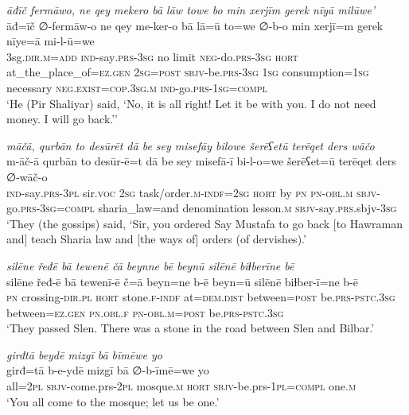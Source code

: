 \ea \label{ŽP.105}
\textit{āđīč fermāwo, ne qey mekero bā lāw towe bo min xerjīm gerek nīyā milūwe’} \\ 
\gll āđ=īč ∅-fermāw-o ne qey me-ker-o bā lā=ū to=we ∅-b-o min xerjī=m gerek nīye=ā mi-l-ū=we \\ 
 3sg\textsc{.dir}\textsc{.m}\textsc{=add} \textsc{ind-}say\textsc{.prs}\textsc{-3sg} no limit \textsc{neg-}do\textsc{.prs}\textsc{-3sg} \textsc{hort} at\_the\_place\_of\textsc{\textsc{=ez.gen}} \textsc{2sg}\textsc{=\textsc{post}} \textsc{sbjv-}be\textsc{.prs}\textsc{-3sg} \textsc{1sg} consumption\textsc{=\textsc{1sg}} necessary \textsc{\textsc{neg.}exist}\textsc{=cop}\textsc{.3sg}\textsc{.m} \textsc{ind-}go\textsc{.prs}\textsc{-\textsc{1sg}}\textsc{=compl} \\ 
\glt `He (Pir Shaliyar) said, ‘No, it is all right! Let it be with you. I do not need money. I will go back.’'
\z 
 
\ea \label{ŽP.126}
\textit{māčā, qurbān to desūrēt dā be sey misefāy bilowe šerēʕetū terēqet ders wāčo} \\ 
\gll m-āč-ā qurbān to desūr-ē=t dā be sey misefā-ī bi-l-o=we šerēʕet=ū terēqet ders ∅-wāč-o \\ 
 \textsc{ind-}say\textsc{.prs}\textsc{-3pl} sir.\textsc{voc} \textsc{2sg} task/order\textsc{.m}\textsc{-indf}\textsc{=\textsc{2sg}} \textsc{hort} by \textsc{pn} \textsc{pn}\textsc{-obl}\textsc{.m} \textsc{sbjv-}go\textsc{.prs}\textsc{-3sg}\textsc{=compl} sharia\_law=and denomination lesson\textsc{.m} \textsc{sbjv-}say\textsc{.prs}.sbjv\textsc{-3sg} \\ 
\glt `They (the gossips) said, ‘Sir, you ordered Say Mustafa to go back [to Hawraman and] teach Sharia law and [the ways of] orders (of dervishes).'
\z 
 
\ea \label{ŽP.167}
\textit{silēne řeđē bā tewenē čā beynne bē beynū silēnē biɫberīne bē} \\ 
\gll silēne řeđ-ē bā tewenī-ē č=ā beyn=ne b-ē beyn=ū silēnē biɫber-ī=ne b-ē \\ 
 \textsc{pn} crossing\textsc{-dir}\textsc{.pl} \textsc{hort} stone\textsc{.f}\textsc{-indf} at=\textsc{dem.dist} between\textsc{=\textsc{post}} be\textsc{.prs}\textsc{-pstc}\textsc{.3sg} between\textsc{\textsc{=ez.gen}} \textsc{pn}\textsc{.obl}\textsc{.f} \textsc{pn}\textsc{-obl}\textsc{.m}\textsc{=\textsc{post}} be\textsc{.prs}\textsc{-pstc}\textsc{.3sg} \\ 
\glt `They passed Slen. There was a stone in the road between Slen and Bilbar.'
\z 
 
\ea \label{BP.55}
\textit{girđtā beydē mizgī bā bīmēwe yo} \\ 
\gll girđ=tā b-e-ydē mizgī bā ∅-b-īmē=we yo \\ 
 all=\textsc{2pl} \textsc{sbjv-}come.prs-\textsc{2pl} mosque\textsc{.m} \textsc{hort} \textsc{sbjv-}be.prs-\textsc{1pl}\textsc{=compl} one\textsc{.m} \\ 
\glt `You all come to the mosque; let us be one.'
\z 
 
